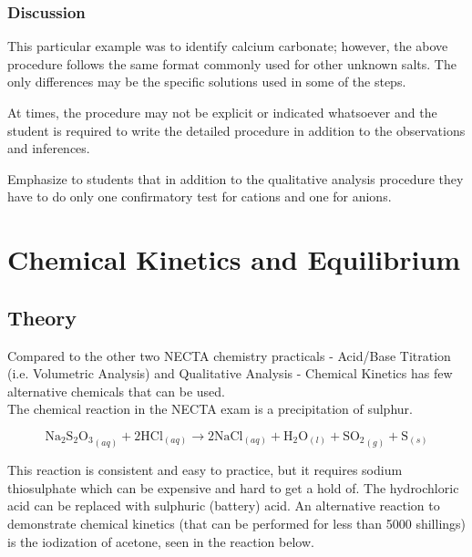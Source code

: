 \subsubsection{Discussion}
This particular example was to identify calcium carbonate; however, the above procedure follows the same format commonly used for other unknown salts. The only differences may be the specific solutions used in some of the steps.

At times, the procedure may not be explicit or indicated whatsoever and the student is required to write the detailed procedure in addition to the observations and inferences. %

Emphasize to students that in addition to the qualitative analysis procedure they have to do only one confirmatory test for cations and one for anions.



\section{Chemical Kinetics and Equilibrium}


\subsection{Theory}
Compared to the other two NECTA chemistry practicals - Acid/Base Titration (i.e. Volumetric Analysis) and Qualitative Analysis - Chemical Kinetics has few alternative chemicals that can be used.\\

The chemical reaction in the NECTA exam is a precipitation of sulphur. 

\[ \mathrm{Na_2S_2O_3}_{(aq)} + \mathrm{2HCl}_{(aq)} \longrightarrow \mathrm{2NaCl}_{(aq)} + \mathrm{H}_{2}\mathrm{O}_{(l)} + \mathrm{SO_2}_{(g)} + \mathrm{S}_{(s)} \]

This reaction is consistent and easy to practice, but it requires sodium thiosulphate which can be expensive and hard to get a hold of. The hydrochloric acid can be replaced with sulphuric (battery) acid. An alternative reaction to demonstrate chemical kinetics (that can be performed for less than 5000 shillings) is the iodization of acetone, seen in the reaction below.

